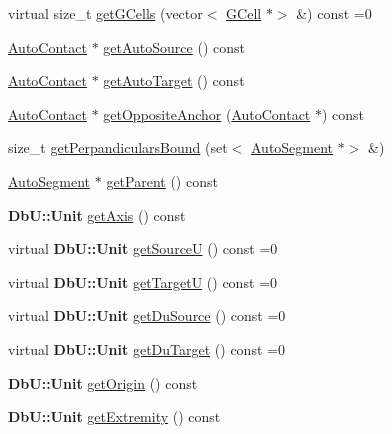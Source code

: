 \begin{DoxyCompactItemize}
\item 
virtual size\+\_\+t \hyperlink{classKatabatic_1_1AutoSegment_a8ca0022e253d355817d46a057ae01625}{get\+G\+Cells} (vector$<$ \hyperlink{classKatabatic_1_1GCell}{G\+Cell} $\ast$$>$ \&) const =0
\item 
\hyperlink{classKatabatic_1_1AutoContact}{Auto\+Contact} $\ast$ \hyperlink{classKatabatic_1_1AutoSegment_a2ca3fac97e325ec8a55d3e03a2ce11a6}{get\+Auto\+Source} () const
\item 
\hyperlink{classKatabatic_1_1AutoContact}{Auto\+Contact} $\ast$ \hyperlink{classKatabatic_1_1AutoSegment_afa494ddc031f4dd1c24999ff83fb878c}{get\+Auto\+Target} () const
\item 
\hyperlink{classKatabatic_1_1AutoContact}{Auto\+Contact} $\ast$ \hyperlink{classKatabatic_1_1AutoSegment_a2c5b0faacc768bf61e17eb72a4ccc248}{get\+Opposite\+Anchor} (\hyperlink{classKatabatic_1_1AutoContact}{Auto\+Contact} $\ast$) const
\item 
size\+\_\+t \hyperlink{classKatabatic_1_1AutoSegment_a206b53c34f57945b6c7bdb711101e38f}{get\+Perpandiculars\+Bound} (set$<$ \hyperlink{classKatabatic_1_1AutoSegment}{Auto\+Segment} $\ast$$>$ \&)
\item 
\hyperlink{classKatabatic_1_1AutoSegment}{Auto\+Segment} $\ast$ \hyperlink{classKatabatic_1_1AutoSegment_a58c1170381b915930188608dab311442}{get\+Parent} () const
\item 
\textbf{ Db\+U\+::\+Unit} \hyperlink{classKatabatic_1_1AutoSegment_ab5b5aaa5b318369feee6003dbad039c2}{get\+Axis} () const
\item 
virtual \textbf{ Db\+U\+::\+Unit} \hyperlink{classKatabatic_1_1AutoSegment_aeaa1543880686755e389c4807128428f}{get\+SourceU} () const =0
\item 
virtual \textbf{ Db\+U\+::\+Unit} \hyperlink{classKatabatic_1_1AutoSegment_a828fef2716cc9c370d6d170bb96556ec}{get\+TargetU} () const =0
\item 
virtual \textbf{ Db\+U\+::\+Unit} \hyperlink{classKatabatic_1_1AutoSegment_ab4881df67bd8f036d0199ed6540fe774}{get\+Du\+Source} () const =0
\item 
virtual \textbf{ Db\+U\+::\+Unit} \hyperlink{classKatabatic_1_1AutoSegment_a0644d656eedc71dba2fb3c6c0d83ed3f}{get\+Du\+Target} () const =0
\item 
\textbf{ Db\+U\+::\+Unit} \hyperlink{classKatabatic_1_1AutoSegment_ab5fb22520af4b94f2ae984304fa64c26}{get\+Origin} () const
\item 
\textbf{ Db\+U\+::\+Unit} \hyperlink{classKatabatic_1_1AutoSegment_a5b81aad92361558c3b9e60fd501b89ba}{get\+Extremity} () const

\end{DoxyCompactItemize}
